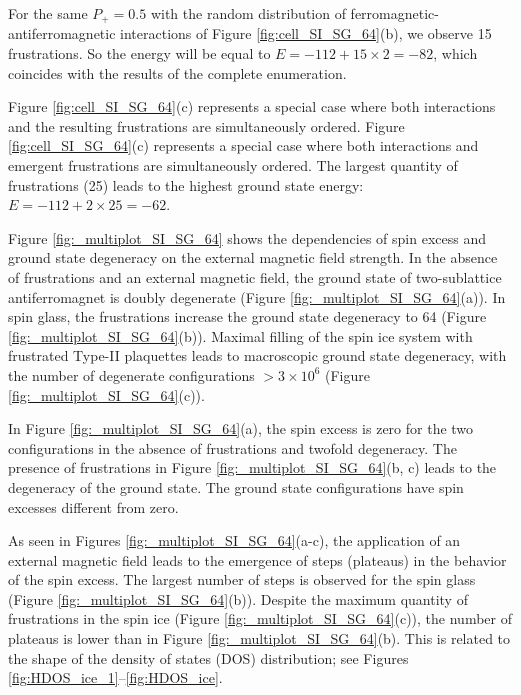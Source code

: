 \documentclass[preprint,12pt]{elsarticle}
\begin{document}
	For the same $P_+ = 0.5$ with the random distribution of ferromagnetic-antiferromagnetic interactions of Figure \ref{fig:cell_SI_SG_64}(b), we observe 15 frustrations. So the energy will be equal to $E = -112 + 15\times2 = -82$, which coincides with the results of the complete enumeration.
	
	Figure \ref{fig:cell_SI_SG_64}(c) represents a special case where both interactions and the resulting frustrations are simultaneously ordered. Figure \ref{fig:cell_SI_SG_64}(c) represents a special case where both interactions and emergent frustrations are simultaneously ordered. The largest quantity of frustrations (25) leads to the highest ground state energy: $E = -112 + 2\times25 = -62$.
	
	Figure \ref{fig:_multiplot_SI_SG_64} shows the dependencies of spin excess and ground state degeneracy on the external magnetic field strength.
	In the absence of frustrations and an external magnetic field, the ground state of two-sublattice antiferromagnet is doubly degenerate (Figure \ref{fig:_multiplot_SI_SG_64}(a)).
	In spin glass, the frustrations increase the ground state degeneracy to 64 (Figure \ref{fig:_multiplot_SI_SG_64}(b)).
	Maximal filling of the spin ice system with frustrated Type-II plaquettes leads to macroscopic ground state degeneracy, with the number of degenerate configurations $> 3\times10^{6}$ (Figure \ref{fig:_multiplot_SI_SG_64}(c)).
	
	In Figure \ref{fig:_multiplot_SI_SG_64}(a), the spin excess is zero for the two configurations in the absence of frustrations and twofold degeneracy. The presence of frustrations in Figure \ref{fig:_multiplot_SI_SG_64}(b, c) leads to the degeneracy of the ground state. The ground state configurations have spin excesses different from zero.
	
	
	As seen in Figures \ref{fig:_multiplot_SI_SG_64}(a-c), the application of an external magnetic field leads to the emergence of steps (plateaus) in the behavior of the spin excess. The largest number of steps is observed for the spin glass (Figure \ref{fig:_multiplot_SI_SG_64}(b)). Despite the maximum quantity of frustrations in the spin ice (Figure \ref{fig:_multiplot_SI_SG_64}(c)), the number of plateaus is lower than in Figure \ref{fig:_multiplot_SI_SG_64}(b). This is related to the shape of the density of states (DOS) distribution; see Figures \ref{fig:HDOS_ice_1}–\ref{fig:HDOS_ice}.
	
\end{document}
